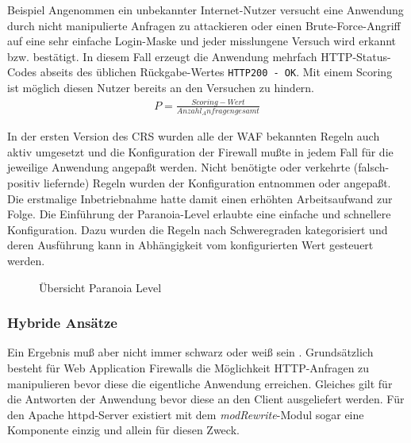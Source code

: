 \textcolor{bhtGray}{ Beispiel} Angenommen ein unbekannter Internet-Nutzer versucht eine Anwendung durch nicht manipulierte Anfragen zu attackieren oder einen Brute-Force-Angriff auf eine sehr einfache Login-Maske und jeder misslungene Versuch wird erkannt bzw. bestätigt. In diesem Fall erzeugt die Anwendung mehrfach HTTP-Status-Codes abseits des üblichen Rückgabe-Wertes \verb=HTTP200 - OK=. Mit einem Scoring ist möglich diesen Nutzer bereits an den Versuchen zu hindern.
\begin{align}
  P = \frac{Scoring-Wert}{Anzahl_Anfragen gesamt}
\end{align}

In der ersten Version des CRS wurden alle der WAF bekannten Regeln auch aktiv umgesetzt und die Konfiguration der Firewall mußte in jedem Fall für die jeweilige Anwendung angepaßt werden. Nicht benötigte oder verkehrte (falsch-positiv liefernde) Regeln wurden der Konfiguration entnommen oder angepaßt. Die erstmalige Inbetriebnahme hatte damit einen erhöhten Arbeitsaufwand zur Folge. Die Einführung der Paranoia-Level erlaubte eine einfache und schnellere Konfiguration. Dazu wurden die Regeln nach Schweregraden kategorisiert und deren Ausführung kann in Abhängigkeit vom konfigurierten Wert gesteuert werden.

\begin{figure}[ht]
  \centering
  
  \caption{Übersicht Paranoia Level \cite{owaspcrs}}
  \label{fig.paranoia}
\end{figure}



\subsubsection{Hybride Ansätze} %
Ein Ergebnis muß aber nicht immer schwarz oder weiß sein \cite{Krueger2010}.  Grundsätzlich besteht für Web Application Firewalls die Möglichkeit HTTP-Anfragen zu manipulieren bevor diese die eigentliche Anwendung erreichen. Gleiches gilt für die Antworten der Anwendung bevor diese an den Client ausgeliefert werden. Für den Apache httpd-Server existiert mit dem \emph{modRewrite}-Modul sogar eine Komponente einzig und allein für diesen Zweck. 


